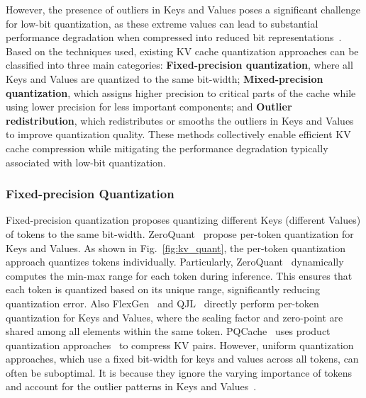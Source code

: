 However, the presence of outliers in Keys and Values poses a significant challenge for low-bit quantization, as these extreme values can lead to substantial performance degradation when compressed into reduced bit representations~\cite{dettmers2022gpt3,bondarenko2021understanding,wei2022outlier}.
Based on the techniques used, existing KV cache quantization approaches can be classified into three main categories: \textbf{Fixed-precision quantization}, where all Keys and Values are quantized to the same bit-width; \textbf{Mixed-precision quantization}, which assigns higher precision to critical parts of the cache while using lower precision for less important components; and \textbf{Outlier redistribution}, which redistributes or smooths the outliers in Keys and Values to improve quantization quality. These methods collectively enable efficient KV cache compression while mitigating the performance degradation typically associated with low-bit quantization.




\subsubsection{Fixed-precision Quantization}\label{sssec:kv_quant_fixed_precision}
Fixed-precision quantization proposes quantizing different Keys (different Values) of tokens to the same bit-width.
ZeroQuant~\cite{yao2022zeroquant} propose per-token quantization for Keys and Values. 
As shown in Fig.~\ref{fig:kv_quant}, the per-token quantization approach quantizes tokens individually.
Particularly, ZeroQuant~\cite{yao2022zeroquant} dynamically computes the min-max range for each token during inference. This ensures that each token is quantized based on its unique range, significantly reducing quantization error.
Also
FlexGen~\cite{DBLP:conf/icml/0007ZYLRCLRSZ23} and QJL~\cite{zandieh2024qjl}  directly perform per-token quantization for Keys and Values, where the scaling factor and zero-point are shared among all elements within the same token.
PQCache~\cite{zhang2024pqcache} uses product quantization approaches~\cite{jegou2010product,matsui2018survey} to compress KV pairs.
However, uniform quantization approaches, which use a fixed bit-width for keys and values across all tokens, can often be suboptimal.
It is because they ignore the varying importance of tokens~\cite{zhang2024unifyingkvcachecompression} and account for the outlier patterns in Keys and Values~\cite{dong2024qaq,hooper2024kvquant}.




